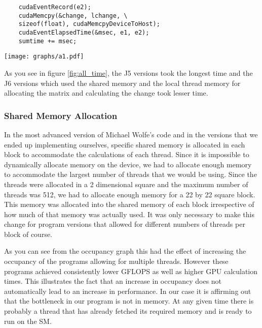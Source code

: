 \documentclass[10pt]{article}
\makeatletter
\newenvironment{figurehere}
{\def\@captype{figure}}
{}
\makeatother
\begin{document}
\begin{multicols}{2}
  \begin{verbatim}
    cudaEventRecord(e2);
    cudaMemcpy(&change, lchange, \
    sizeof(float), cudaMemcpyDeviceToHost);
    cudaEventElapsedTime(&msec, e1, e2);
    sumtime += msec;
  \end{verbatim}

  \begin{figurehere}
    \centering
    \texttt{[image: graphs/a1.pdf]}
    \caption{}
    \label{fig:all_time}
  \end{figurehere}

  As you see in figure \ref{fig:all_time}, the J5 versions took the longest time and the J6 versions which used the shared memory and the local thread memory for allocating the matrix and calculating the change took lesser time.


  \subsubsection{Shared Memory Allocation}%
  In the most advanced version of Michael Wolfe's code and in the versions that we ended up implementing ourselves, specific shared memory is allocated in each block to accommodate the calculations of each thread.
  Since it is impossible to dynamically allocate memory on the device, we had to allocate enough memory to accommodate the largest number of threads that we would be using.
  Since the threads were allocated in a 2 dimensional square and the maximum number of threads was 512, we had to allocate enough memory for a 22 by 22 square block.
  This memory was allocated into the shared memory of each block irrespective of how much of that memory was actually used.
  It was only necessary to make this change for program versions that allowed for different numbers of threads per block of course.

  As you can see from the occupancy graph this had the effect of increasing the occupancy of the programs allowing for multiple threads.
  However these programs achieved consistently lower GFLOPS as well as higher GPU calculation times.
  This illustrates the fact that an increase in occupancy does not automatically lead to an increase in performance.
  In our case it is affirming out that the bottleneck in our program is not in memory.
  At any given time there is probably a thread that has already fetched its required memory and is ready to run on the SM.


\end{multicols}
\end{document}
